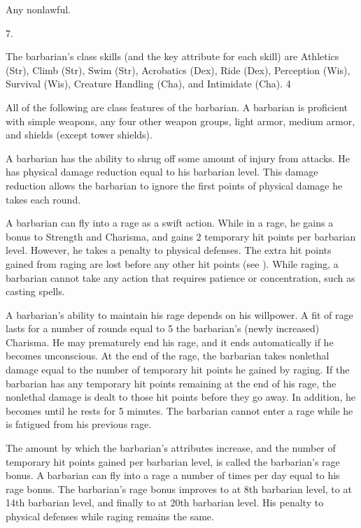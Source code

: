  Any nonlawful.

 7.

The barbarian's class skills (and the key attribute for each skill) are
Athletics (Str), Climb (Str), Swim (Str), Acrobatics (Dex), Ride (Dex), Perception (Wis), Survival (Wis), Creature Handling (Cha), and Intimidate (Cha).
 4


All of the following are class features of the barbarian.
  A barbarian is proficient with simple weapons, any four other weapon groups, light armor, medium armor, and shields (except tower shields).

 A barbarian has the ability to shrug off some amount of injury from attacks. He has physical damage reduction equal to his barbarian level. This damage reduction allows the barbarian to ignore the first points of physical damage he takes each round.

 A barbarian can fly into a rage as a swift action. While in a rage, he gains a  bonus to Strength and Charisma, and gains 2 temporary hit points per barbarian level. However, he takes a  penalty to physical defenses. The extra hit points gained from raging are lost before any other hit points (see ). While raging, a barbarian cannot take any action that requires patience or concentration, such as casting spells.

A barbarian's ability to maintain his rage depends on his willpower. A fit of rage lasts for a number of rounds equal to 5 \add the barbarian's (newly increased) Charisma. He may prematurely end his rage, and it ends automatically if he becomes unconscious. At the end of the rage, the barbarian takes nonlethal damage equal to the number of temporary hit points he gained by raging. If the barbarian has any temporary hit points remaining at the end of his rage, the nonlethal damage is dealt to those hit points before they go away. In addition, he becomes \fatigued until he rests for 5 minutes. The barbarian cannot enter a rage while he is fatigued from his previous rage.

The amount by which the barbarian's attributes increase, and the number of temporary hit points gained per barbarian level, is called the barbarian's rage bonus. A barbarian can fly into a rage a number of times per day equal to his rage bonus. The barbarian's rage bonus improves to  at 8th barbarian level, to  at 14th barbarian level, and finally to  at 20th barbarian level. His penalty to physical defenses while raging remains the same.

